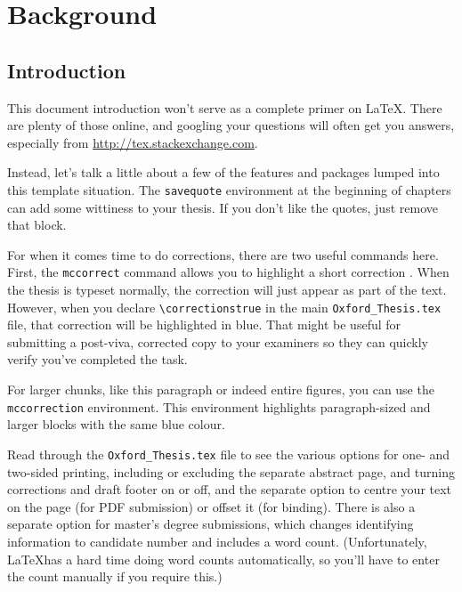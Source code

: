 \chapter{\label{ch:2-litreview}Background}

\section{Introduction}

This document introduction won't serve as a complete primer on \LaTeX.  There are plenty of those online, and googling your questions will often get you answers, especially from \url{http://tex.stackexchange.com}.

Instead, let's talk a little about a few of the features and packages lumped into this template situation.  The \verb|savequote| environment at the beginning of chapters can add some wittiness to your thesis.  If you don't like the quotes, just remove that block.

For when it comes time to do corrections, there are two useful commands here.  First, the \verb|mccorrect| command allows you to highlight a short correction .  When the thesis is typeset normally, the correction will just appear as part of the text.  However, when you declare \verb|\correctionstrue| in the main \verb|Oxford_Thesis.tex| file, that correction will be highlighted in blue.  That might be useful for submitting a post-viva, corrected copy to your examiners so they can quickly verify you've completed the task.

\begin{mccorrection}
For larger chunks, like this paragraph or indeed entire figures, you can use the \verb|mccorrection| environment.  This environment highlights paragraph-sized and larger blocks with the same blue colour.
\end{mccorrection}

Read through the \verb|Oxford_Thesis.tex| file to see the various options for one- and two-sided printing, including or excluding the separate abstract page, and turning corrections and draft footer on or off, and the separate option to centre your text on the page (for PDF submission) or offset it (for binding).  There is also a separate option for master's degree submissions, which changes identifying information to candidate number and includes a word count.  (Unfortunately, \LaTeX has a hard time doing word counts automatically, so you'll have to enter the count manually if you require this.)

